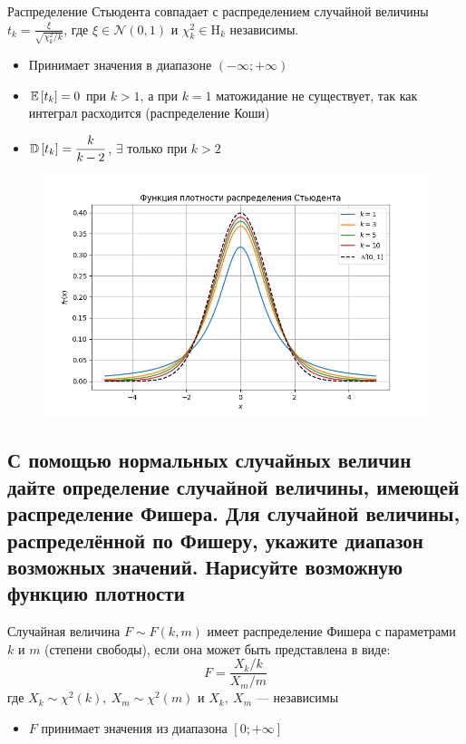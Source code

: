 \documentclass{article}
\begin{document}
Распределение Стьюдента совпадает с распределением случайной величины $t_k=\frac{\xi}{\sqrt{\chi_k^2 / k}}$, где $\xi \in \mathcal{N}(0,1)$ и $\chi_k^2 \in \mathrm{H}_k$ независимы.
\begin{itemize}
    \item Принимает значения в диапазоне $(-\infty;+\infty)$
    \item $\mathbb{E}\left[t_k\right]=0$ при $k>1$, а при $k=1$ матожидание не существует, так как интеграл расходится (распределение Коши)
    \item $\mathbb{D}\left[t_k\right]=\displaystyle\frac{k}{k-2}$, $\exists$ только при $k>2$
\end{itemize}

\begin{figure}[h]
    \centering
    \includegraphics[width=0.8\linewidth]{student.png}
\end{figure}


\newpage
\subsection{С помощью нормальных случайных величин дайте определение случайной величины, имеющей распределение Фишера. Для случайной величины, распределённой по Фишеру, укажите диапазон возможных значений. Нарисуйте возможную функцию плотности}
 Случайная величина $F\sim F(k,m)$ имеет распределение Фишера с параметрами $k$ и $m$ (степени свободы), если она может быть представлена в виде:
\begin{equation*}
    F = \frac{X_k/k}{X_m/m}
\end{equation*}
где $X_k\sim\chi^2(k),\ X_m\sim\chi^2(m)$ и $X_k,\ X_m$ — независимы

\begin{itemize}
    \item $F$ принимает значения из диапазона $[0;+\infty]$
\end{itemize}
\end{document}
